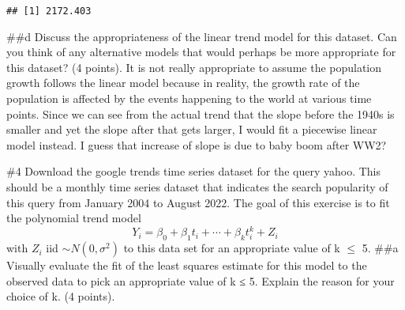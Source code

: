 \documentclass[
]{article}
\newenvironment{Shaded}{\begin{snugshade}}{\end{snugshade}}
\newcommand{\AttributeTok}[1]{\textcolor[rgb]{0.77,0.63,0.00}{#1}}
\newcommand{\CommentTok}[1]{\textcolor[rgb]{0.56,0.35,0.01}{\textit{#1}}}
\newcommand{\DecValTok}[1]{\textcolor[rgb]{0.00,0.00,0.81}{#1}}
\newcommand{\FunctionTok}[1]{\textcolor[rgb]{0.00,0.00,0.00}{#1}}
\newcommand{\NormalTok}[1]{#1}
\newcommand{\OtherTok}[1]{\textcolor[rgb]{0.56,0.35,0.01}{#1}}
\newcommand{\SpecialCharTok}[1]{\textcolor[rgb]{0.00,0.00,0.00}{#1}}
\newcommand{\StringTok}[1]{\textcolor[rgb]{0.31,0.60,0.02}{#1}}
\begin{document}
\begin{verbatim}
## [1] 2172.403
\end{verbatim}

\#\#d Discuss the appropriateness of the linear trend model for this
dataset. Can you think of any alternative models that would perhaps be
more appropriate for this dataset? (4 points). It is not really
appropriate to assume the population growth follows the linear model
because in reality, the growth rate of the population is affected by the
events happening to the world at various time points. Since we can see
from the actual trend that the slope before the 1940s is smaller and yet
the slope after that gets larger, I would fit a piecewise linear model
instead. I guess that increase of slope is due to baby boom after WW2?

\#4 Download the google trends time series dataset for the query yahoo.
This should be a monthly time series dataset that indicates the search
popularity of this query from January 2004 to August 2022. The goal of
this exercise is to fit the polynomial trend model
\[Y_i = \beta_0 + \beta_1 t_i + \cdots + \beta_k t_i^k + Z_i\] with
\(Z_i\) iid \(\sim N(0, \sigma^2)\) to this data set for an appropriate
value of k \(\leq\) 5. \#\#a Visually evaluate the fit of the least
squares estimate for this model to the observed data to pick an
appropriate value of k ≤ 5. Explain the reason for your choice of k. (4
points).

\begin{Shaded}
\end{Shaded}
\end{document}
